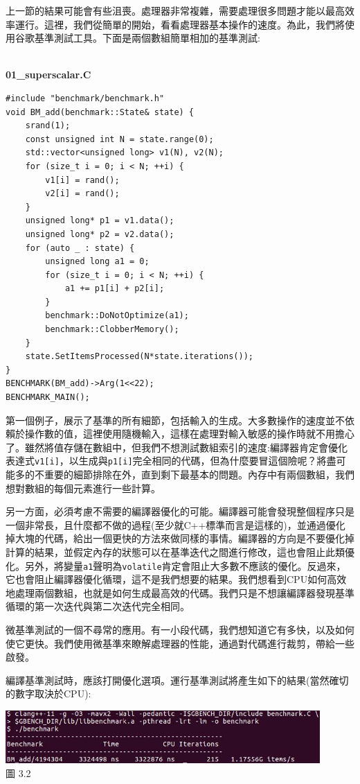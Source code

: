 
上一節的結果可能會有些沮喪。處理器非常複雜，需要處理很多問題才能以最高效率運行。這裡，我們從簡單的開始，看看處理器基本操作的速度。為此，我們將使用谷歌基準測試工具。下面是兩個數組簡單相加的基準測試:

\hspace*{\fill} \\ %
\noindent
\textbf{01\_superscalar.C}
\begin{lstlisting}[style=styleCXX]
#include "benchmark/benchmark.h"
void BM_add(benchmark::State& state) {
	srand(1);
	const unsigned int N = state.range(0);
	std::vector<unsigned long> v1(N), v2(N);
	for (size_t i = 0; i < N; ++i) {
		v1[i] = rand();
		v2[i] = rand();
	}
	unsigned long* p1 = v1.data();
	unsigned long* p2 = v2.data();
	for (auto _ : state) {
		unsigned long a1 = 0;
		for (size_t i = 0; i < N; ++i) {
			a1 += p1[i] + p2[i];
		}
		benchmark::DoNotOptimize(a1);
		benchmark::ClobberMemory();
	}
	state.SetItemsProcessed(N*state.iterations());
}
BENCHMARK(BM_add)->Arg(1<<22);
BENCHMARK_MAIN();
\end{lstlisting}

第一個例子，展示了基準的所有細節，包括輸入的生成。大多數操作的速度並不依賴於操作數的值，這裡使用隨機輸入，這樣在處理對輸入敏感的操作時就不用擔心了。雖然將值存儲在數組中，但我們不想測試數組索引的速度:編譯器肯定會優化表達式\texttt{v1[i]}，以生成與\texttt{p1[i]}完全相同的代碼，但為什麼要冒這個險呢？將盡可能多的不重要的細節排除在外，直到剩下最基本的問題。內存中有兩個數組，我們想對數組的每個元素進行一些計算。

另一方面，必須考慮不需要的編譯器優化的可能。編譯器可能會發現整個程序只是一個非常長，且什麼都不做的過程(至少就C++標準而言是這樣的)，並通過優化掉大塊的代碼，給出一個更快的方法來做同樣的事情。編譯器的方向是不要優化掉計算的結果，並假定內存的狀態可以在基準迭代之間進行修改，這也會阻止此類優化。另外，將變量\texttt{a1}聲明為\texttt{volatile}肯定會阻止大多數不應該的優化。反過來，它也會阻止編譯器優化循環，這不是我們想要的結果。我們想看到CPU如何高效地處理兩個數組，也就是如何生成最高效的代碼。我們只是不想讓編譯器發現基準循環的第一次迭代與第二次迭代完全相同。

微基準測試的一個不尋常的應用。有一小段代碼，我們想知道它有多快，以及如何使它更快。我們使用微基準來瞭解處理器的性能，通過對代碼進行裁剪，帶給一些啟發。

編譯基準測試時，應該打開優化選項。運行基準測試將產生如下的結果(當然確切的數字取決於CPU):

\begin{center}
\includegraphics[width=0.9\textwidth]{content/1/chapter3/images/2.jpg}\\
圖 3.2
\end{center}

